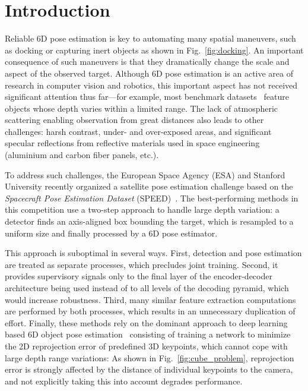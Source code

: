 
\section{Introduction}
\label{sec:introduction}

Reliable 6D pose estimation is key to automating many spatial maneuvers, such
as docking or capturing inert objects as shown in Fig.~\ref{fig:docking}. An
important consequence of such maneuvers is that they dramatically change the
scale and aspect of the observed target. Although 6D pose estimation is an
active area of research in computer vision and robotics, this important aspect
has not received significant attention thus far---for example, most benchmark
datasets~\cite{Hinterstoisser12b,Krull15,Xiang18b,Hodan18} feature objects whose depth varies within a limited range.
The lack of atmospheric scattering enabling observation from great
distances also leads to other challenges: harsh contrast, under- and
over-exposed areas, and significant specular reflections from reflective
materials used in space engineering (aluminium and carbon fiber panels, etc.).


% 

To address such challenges, the European Space Agency (ESA) and Stanford
University recently organized a satellite pose estimation challenge based on
the \emph{Spacecraft Pose Estimation Dataset} (SPEED)~\cite{Kisantal20}. The best-performing
methods in this competition use a two-step approach to handle large depth
variation: a detector finds an axis-aligned box bounding the target, which is
resampled to a uniform size and finally processed by a 6D pose estimator.

This approach is suboptimal in several ways. First, detection and pose
estimation are treated as separate processes, which precludes joint training.
Second, it provides supervisory signals only to the final layer of the
encoder-decoder architecture being used instead of to all levels of the
decoding pyramid, which would increase robustness. Third, many similar feature
extraction computations are performed by both processes, which results in an
unnecessary duplication of effort. Finally, these methods rely on the dominant approach
to deep learning based 6D object pose estimation~\cite{Rad17,Hu19a,Chen19DLR} consisting of
training a network to minimize the 2D reprojection error of predefined 3D
keypoints, which cannot cope with large depth range variations: As shown
in Fig.~\ref{fig:cube_problem}, reprojection error is strongly affected by the
distance of individual keypoints to the camera, and not explicitly taking this
into account degrades performance. 

